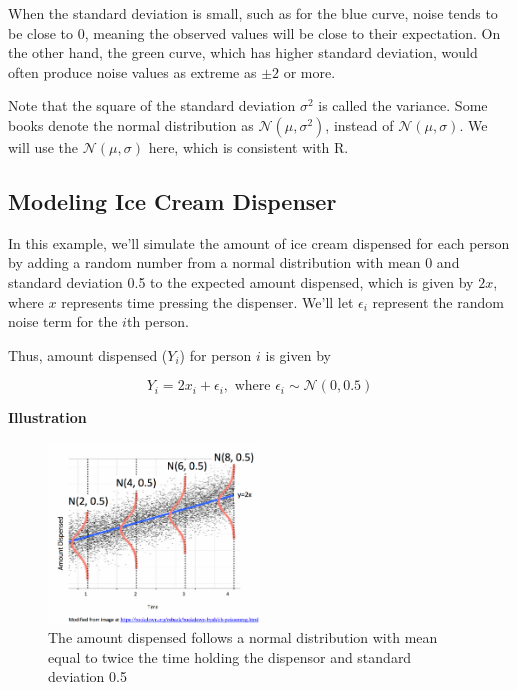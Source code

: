 \documentclass[
  letterpaper,
  DIV=11,
  numbers=noendperiod]{scrreprt}
\begin{document}
When the standard deviation is small, such as for the blue curve, noise
tends to be close to 0, meaning the observed values will be close to
their expectation. On the other hand, the green curve, which has higher
standard deviation, would often produce noise values as extreme as
\(\pm 2\) or more.

Note that the square of the standard deviation \(\sigma^2\) is called
the variance. Some books denote the normal distribution as
\(\mathcal{N}(\mu, \sigma^2)\), instead of \(\mathcal{N}(\mu,\sigma)\).
We will use the \(\mathcal{N}(\mu,\sigma)\) here, which is consistent
with R.

\subsection{Modeling Ice Cream
Dispenser}\label{modeling-ice-cream-dispenser}

In this example, we'll simulate the amount of ice cream dispensed for
each person by adding a random number from a normal distribution with
mean 0 and standard deviation 0.5 to the expected amount dispensed,
which is given by \(2x\), where \(x\) represents time pressing the
dispenser. We'll let \(\epsilon_i\) represent the random noise term for
the \(i\)th person.

Thus, amount dispensed (\(Y_i\)) for person \(i\) is given by

\[
Y_i = 2x_i+\epsilon_i, \text{ where } \epsilon_i\sim\mathcal{N}(0, 0.5)
\]

\textbf{Illustration}

\begin{figure}[H]

{\centering \includegraphics[width=0.5\textwidth,height=\textheight]{SLR_Model_Assumptions.png}

}

\caption{The amount dispensed follows a normal distribution with mean
equal to twice the time holding the dispensor and standard deviation
0.5}

\end{figure}%
\end{document}
